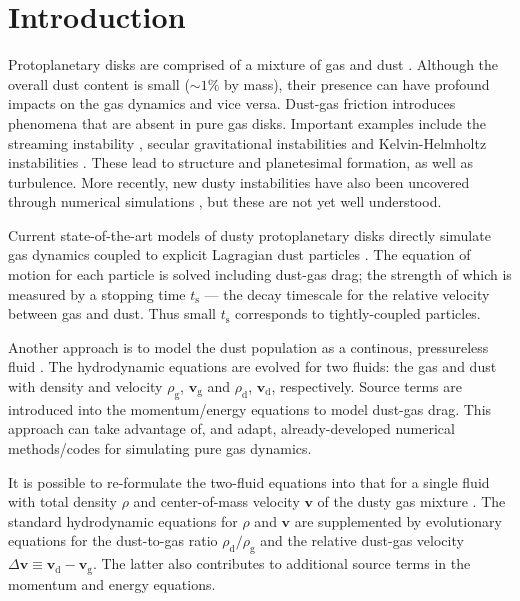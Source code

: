 \documentclass[iop, numberedappendix]{emulateapj}
\newcommand{\rhod}{\rho_\mathrm{d}}
\newcommand{\rhog}{\rho_\mathrm{g}}
\newcommand{\tstop}{t_\mathrm{s}}
\begin{document}
\section{Introduction}
Protoplanetary disks are comprised of a mixture of gas and dust
\citep{chiang10}. Although the overall dust content is small
($\sim 1\%$ by mass), their presence can have profound impacts on the 
gas dynamics and vice versa. Dust-gas friction introduces phenomena
that are absent in pure gas disks. Important examples include the
streaming instability 
\citep[SI,][]{youdin05a,youdin07b,johansen07}, secular gravitational
instabilities \citep[SGI,][]{ward00,youdin11,michikoshi12,takahashi14} and
Kelvin-Helmholtz instabilities
\citep{chiang08,barranco09,lee10}. These lead to structure and
planetesimal formation, as well as turbulence. 
More recently, new 
dusty instabilities have also been uncovered through numerical
simulations \citep{loren15,loren16,lamb16}, but these are not yet well
understood. 



Current state-of-the-art models of dusty protoplanetary
disks directly simulate gas dynamics coupled to explicit
Lagragian dust particles
\citep{nelson10,bai10,johansen11,yang14,zhu14,gibbons15,simon16,baruteau16}. 
The equation of motion for each particle is solved 
including dust-gas drag; the strength of which is measured 
by a stopping time $\tstop$ --- the decay timescale for the 
relative velocity between gas and dust. Thus small $\tstop$
corresponds to tightly-coupled particles. 


Another approach is to model the dust population as a continous, pressureless
fluid 
\citep{paardekooper06b,meheut12,laibe12,loren14,fu14b,surville16}. The 
hydrodynamic equations are evolved for two fluids: the gas and dust with density and
velocity $\rhog$, $\bm{v}_\mathrm{g}$ and $\rhod$, 
$\bm{v}_\mathrm{d}$, respectively. Source terms are introduced into
the momentum/energy equations to model dust-gas drag. This approach
can take advantage of, and adapt, already-developed numerical methods/codes for
simulating pure gas dynamics. 


It is possible to re-formulate the two-fluid equations into that for a
single fluid with total density $\rho$ and center-of-mass
velocity $\bm{v}$ of the dusty gas mixture
\citep{laibe14}. The standard hydrodynamic equations for
$\rho$ and $\bm{v}$ are supplemented by evolutionary equations for
the dust-to-gas ratio $\rhod/\rhog$ and the relative dust-gas velocity
$\Delta\bm{v}\equiv \bm{v}_\mathrm{d}-\bm{v}_\mathrm{g}$. The latter also contributes to 
additional source terms in the momentum and energy equations.  
\end{document}
